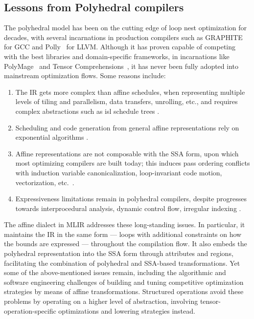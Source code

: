\subsection{Lessons from Polyhedral compilers}
The polyhedral model has been on the cutting edge of loop nest optimization for decades, with several incarnations in production compilers such as GRAPHITE~\cite{GRAPHITE} for GCC and Polly~\cite{Polly} for LLVM. 
Although it has proven capable of competing with the best libraries and domain-specific frameworks, in incarnations like PolyMage~\cite{PolyMage} 
and Tensor Comprehensions~\cite{vasilache2019next}, it has never been fully adopted into mainstream optimization flows.
Some reasons include:
\begin{enumerate}
    \item The IR gets more complex than affine schedules, when representing multiple levels of tiling and parallelism, data transfers, unrolling, etc., and requires complex abstractions such as isl schedule trees \cite{isl}.
    \item Scheduling and code generation from general affine representations rely on exponential algorithms \cite{Fea92a,Fea92b,Bas04,Pluto,RStream,Gro15,isl}.
    \item Affine representations are not composable with the SSA form,
    upon which most optimizing compilers are built today; this induces pass ordering conflicts with induction variable canonicalization, loop-invariant code motion, vectorization, etc.\ \cite{DeLICM}.
    \item Expressiveness limitations remain in polyhedral compilers, despite progresses towards interprocedural analysis, dynamic control flow, irregular indexing \cite{PIPS,PENCIL,Zha18}.
\end{enumerate}

The affine dialect in MLIR addresses these long-standing issues. 
In particular, it maintains the IR in the same form --- loops with additional constraints on how the bounds are expressed ---
throughout the compilation flow.
It also embeds the polyhedral representation into the SSA form through attributes and regions, facilitating the combination of
polyhedral and SSA-based transformations.
Yet some of the above-mentioned issues remain, including the algorithmic and software engineering challenges of building and tuning competitive optimization strategies by means of affine transformations. Structured operations avoid these problems by operating on a higher level of abstraction, involving tensor-operation-specific optimizations and lowering strategies instead.

